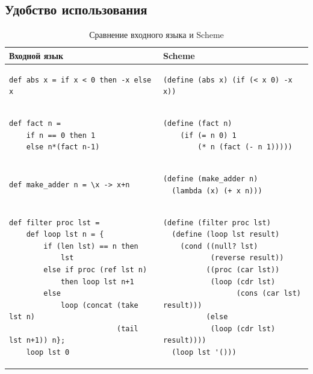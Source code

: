 \documentclass[12pt,a4paper,oneside]{extarticle}
\begin{document}
    \subsection{Удобство использования}
        \begin{table}
            \label{tabular:syntax}
            \centering        
            \begin{tabular}{|l|l|}
                \hline
                \textbf{Входной язык} & \textbf{Scheme}
                \\ \hline
                    \begin{lstlisting}
def abs x = if x < 0 then -x else x
                   \end{lstlisting} &
                    \begin{lstlisting}
(define (abs x) (if (< x 0) -x x))
                    \end{lstlisting}
                \\ \hline
                    \begin{lstlisting}
def fact n = 
    if n == 0 then 1
    else n*(fact n-1)
                    \end{lstlisting} &
                    \begin{lstlisting}
(define (fact n)
    (if (= n 0) 1
        (* n (fact (- n 1)))))
                    \end{lstlisting}
                \\ \hline
                    \begin{lstlisting}
def make_adder n = \x -> x+n
                    \end{lstlisting} &
                    \begin{lstlisting}
(define (make_adder n) 
  (lambda (x) (+ x n)))
                    \end{lstlisting}
                \\ \hline
                    \begin{lstlisting}
def filter proc lst = 
    def loop lst n = {
        if (len lst) == n then 
            lst
        else if proc (ref lst n) 
            then loop lst n+1
        else 
            loop (concat (take lst n)
                         (tail lst n+1)) n};
    loop lst 0
                    \end{lstlisting} &
                    \begin{lstlisting}
(define (filter proc lst)
  (define (loop lst result)
    (cond ((null? lst) 
           (reverse result))
          ((proc (car lst)) 
           (loop (cdr lst) 
                 (cons (car lst) result)))
          (else 
           (loop (cdr lst) result))))
  (loop lst '()))
                    \end{lstlisting}
                \\ \hline
            \end{tabular}
        \caption{Сравнение входного языка и Scheme}
        \end{table}
\end{document}

